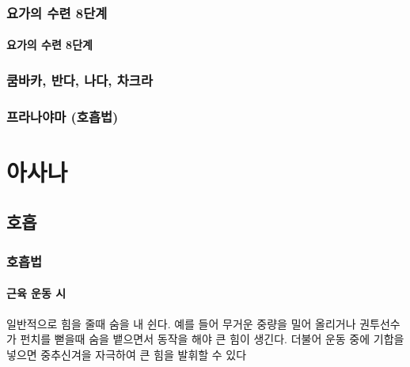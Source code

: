 \documentclass[12pt, a4paper, oneside]{book}
\let\stdsection\section
\renewcommand\section{\newpage\stdsection}
\begin{document}
%
	\section{요가의 수련 8단계}

	\subsection{요가의 수련 8단계}

	\section{쿰바카, 반다, 나다, 차크라}

	\section{프라나야마 (호흡법)}






%
%
%




	\part{아사나}
		\noptcrule
		\parttoc				



	\chapter{호흡}


		\section{호흡법}

		\subsection{근육 운동 시 }
일반적으로 힘을 줄때 숨을 내 쉰다.
예를 들어 무거운 중량을 밀어 올리거나 권투선수가 펀치를 뻗을때 숨을 뱉으면서 동작을 해야 큰 힘이 생긴다.
더불어 운동 중에 기합을 넣으면 중추신겨을 자극하여 큰 힘을 발휘할 수 있다
\end{document}
